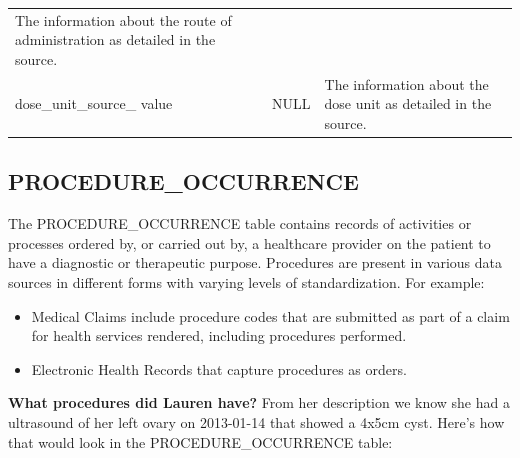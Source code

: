 \documentclass[11pt]{book}
\providecommand{\tightlist}{%
  \setlength{\itemsep}{0pt}\setlength{\parskip}{0pt}}
\begin{document}
\begin{longtable}[]{@{}lll@{}}
\begin{minipage}[t]{0.48\columnwidth}
The information about the route of administration as detailed in the
source.\strut
\end{minipage}\tabularnewline
\begin{minipage}[t]{0.28\columnwidth}\raggedright\strut
dose\_unit\_source\_ value\strut
\end{minipage} & \begin{minipage}[t]{0.16\columnwidth}\raggedright\strut
NULL\strut
\end{minipage} & \begin{minipage}[t]{0.48\columnwidth}\raggedright\strut
The information about the dose unit as detailed in the source.\strut
\end{minipage}\tabularnewline
\bottomrule
\end{longtable}

\subsection{PROCEDURE\_OCCURRENCE}\label{procedureOccurrence}

The PROCEDURE\_OCCURRENCE table contains records of activities or
processes ordered by, or carried out by, a healthcare provider on the
patient to have a diagnostic or therapeutic purpose. Procedures are
present in various data sources in different forms with varying levels
of standardization. For example:

\begin{itemize}
\tightlist
\item
  Medical Claims include procedure codes that are submitted as part of a
  claim for health services rendered, including procedures performed.
\item
  Electronic Health Records that capture procedures as orders.
\end{itemize}

\textbf{What procedures did Lauren have?} From her description we know
she had a ultrasound of her left ovary on 2013-01-14 that showed a 4x5cm
cyst. Here's how that would look in the PROCEDURE\_OCCURRENCE table:
\end{document}
